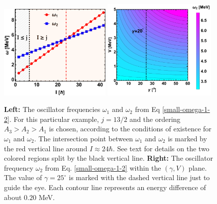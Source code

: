 \begin{figure}
    \centering
    \includegraphics[width=0.48\textwidth]{Chapters/Figures/omega-1-2-frequencies-1.pdf}
    \includegraphics[width=0.49\textwidth]{Chapters/Figures/omega-2-gamma-V.pdf}
    \caption{\textbf{Left:} The oscillator frequencies $\omega_1$ and $\omega_2$ from Eq \ref{small-omega-1-2}. For this particular example, $j=13/2$ and the ordering $A_3>A_2>A_1$ is chosen, according to the conditions of existence for $\omega_1$ and $\omega_2$. The intersection point between $\omega_1$ and $\omega_2$ is marked by the red vertical line around $I\approx 24\hbar$. See text for details on the two colored regions split by the black vertical line. \textbf{Right:} The oscillator frequency $\omega_2$ from Eq. \ref{small-omega-1-2} within the $(\gamma,V)$ plane. The value of $\gamma=25^\circ$ is marked with the dashed vertical line just to guide the eye. Each contour line represents an energy difference of about $0.20$ MeV.}
    \label{fig-omega1-omega2-cp-omega2}
\end{figure} 

